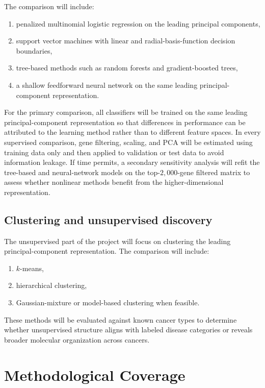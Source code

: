 \documentclass[12pt]{article}
\newcommand{\1}{\mathbf{1}}
\begin{document}
The comparison will include:
\begin{enumerate}
    \item penalized multinomial logistic regression on the leading principal components,
    \item support vector machines with linear and radial-basis-function decision boundaries,
    \item tree-based methods such as random forests and gradient-boosted trees,
    \item a shallow feedforward neural network on the same leading principal-component representation.
\end{enumerate}

For the primary comparison, all classifiers will be trained on the same leading principal-component representation so that differences in performance can be attributed to the learning method rather than to different feature spaces. In every supervised comparison, gene filtering, scaling, and PCA will be estimated using training data only and then applied to validation or test data to avoid information leakage. If time permits, a secondary sensitivity analysis will refit the tree-based and neural-network models on the top-\(2{,}000\)-gene filtered matrix to assess whether nonlinear methods benefit from the higher-dimensional representation.

\subsection{Clustering and unsupervised discovery}

The unsupervised part of the project will focus on clustering the leading principal-component representation. The comparison will include:
\begin{enumerate}
    \item \(k\)-means,
    \item hierarchical clustering,
    \item Gaussian-mixture or model-based clustering when feasible.
\end{enumerate}

These methods will be evaluated against known cancer types to determine whether unsupervised structure aligns with labeled disease categories or reveals broader molecular organization across cancers.

\section{Methodological Coverage}
\end{document}
